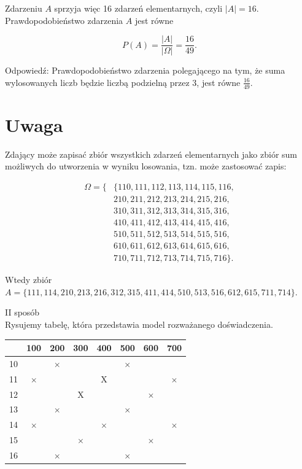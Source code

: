 \documentclass[10pt]{article}
\begin{document}
Zdarzeniu $A$ sprzyja więc 16 zdarzeń elementarnych, czyli $|A|=16$.\\
Prawdopodobieństwo zdarzenia $A$ jest równe

$$
P(A)=\frac{|A|}{|\Omega|}=\frac{16}{49} .
$$

Odpowiedź: Prawdopodobieństwo zdarzenia polegającego na tym, że suma wylosowanych liczb będzie liczbą podzielną przez 3, jest równe $\frac{16}{49}$.

\section*{Uwaga}
Zdający może zapisać zbiór wszystkich zdarzeń elementarnych jako zbiór sum możliwych do utworzenia w wyniku losowania, tzn. może zastosować zapis:

$$
\begin{aligned}
\Omega=\{ & \{110,111,112,113,114,115,116, \\
& 210,211,212,213,214,215,216, \\
& 310,311,312,313,314,315,316, \\
& 410,411,412,413,414,415,416, \\
& 510,511,512,513,514,515,516, \\
& 610,611,612,613,614,615,616, \\
& 710,711,712,713,714,715,716\} .
\end{aligned}
$$

Wtedy zbiór\\
$A=\{111,114,210,213,216,312,315,411,414,510,513,516,612,615,711,714\}$.

II sposób\\
Rysujemy tabelę, która przedstawia model rozważanego doświadczenia.

\begin{center}
\begin{tabular}{|c|c|c|c|c|c|c|c|}
\hline
 & 100 & 200 & 300 & 400 & 500 & 600 & 700 \\
\hline
10 &  & $\times$ &  &  & $\times$ &  &  \\
\hline
11 & $\times$ &  &  & X &  &  & $\times$ \\
\hline
12 &  &  & X &  &  & $\times$ &  \\
\hline
13 &  & $\times$ &  &  & $\times$ &  &  \\
\hline
14 & $\times$ &  &  & $\times$ &  &  & $\times$ \\
\hline
15 &  &  & $\times$ &  &  & $\times$ &  \\
\hline
16 &  & $\times$ &  &  & $\times$ &  &  \\
\hline
\end{tabular}
\end{center}
\end{document}
